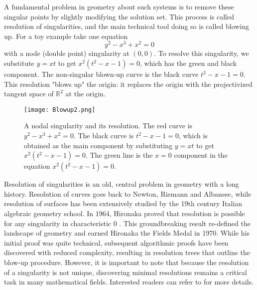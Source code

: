 \documentclass{article}
\theoremstyle{plain}
\theoremstyle{definition}
\theoremstyle{remark}
\begin{document}
A fundamental problem in geometry about such systems is to remove these singular points by slightly modifying the solution set. This process is called resolution of singularities, and the main technical tool doing so is called blowing up.  For a toy example take one equation 
\[y^2-x^3+x^2=0\]
with a node (double point) singularity at $(0,0)$. To resolve this singularity, we substitute $y=xt$ to get $x^2(t^2-x-1)=0$, which has the green and black component. The non-singular blown-up curve is the black curve $t^2-x-1=0$. This resolution "blows up"  the origin: it replaces the origin 
with the projectivized tangent space of $\mathbb{R}^2$ at the origin. 
\begin{figure}[ht!]
\centering
\texttt{[image: Blowup2.png]}
\caption{A nodal singularity and its resolution. The red curve is $y^2-x^3+x^2=0$. The black curve is $t^2-x-1=0$, which is obtained as the main component by substituting $y=xt$ to get $x^2(t^2-x-1)=0$. The green line is the $x=0$ component in the equation $x^2(t^2-x-1)=0$.} \label{fig1}
\end{figure}



Resolution of singularities is an old, central problem in geometry with a long history.  Resolution of curves goes back to Newton, Riemann and Albanese, while resolution of surfaces has been extensively studied by the 19th century Italian algebraic geometry school. In 1964, Hironaka proved that resolution is possible for any singularity in characteristic $0$ \cite{hironaka}. This groundbreaking result re-defined the landscape of geometry and earned Hironaka the Fields Medal in 1970. While his initial proof was quite technical, subsequent algorithmic proofs \cite{vlo,atv} have been discovered with reduced complexity, resulting in resolution trees that outline the blow-up procedure. However, it is important to note that because the resolution of a singularity is not unique, discovering minimal resolutions remains a critical task in many mathematical fields. Interested readers can refer to \cite{kollar,abrICM} for more details. 
\end{document}
